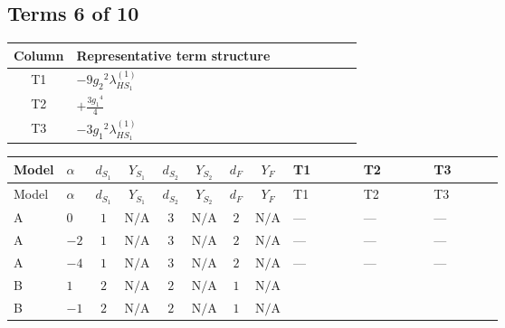 \documentclass[8pt]{article}
\begin{document}
\begin{landscape}
\subsection*{Terms 6 of 10}
\begin{center}
\begin{tabular}{@{}c >{\raggedright\arraybackslash}p{0.82\linewidth}@{}}
\toprule
Column & Representative term structure \\
\midrule
T1 & \(\displaystyle -9 {g_2}^2 {\lambda_{HS_1}^{(1)}}\) \\
\midrule
T2 & \(\displaystyle +\frac{3 {g_1}^4}{4}\) \\
\midrule
T3 & \(\displaystyle -3 {g_1}^2 {\lambda_{HS_1}^{(1)}}\) \\
\midrule
\bottomrule
\end{tabular}
\end{center}
\smallskip
\tiny
\begin{longtable}{@{}llcccccc >{\raggedright\arraybackslash}p{0.21\linewidth} >{\raggedright\arraybackslash}p{0.21\linewidth} >{\raggedright\arraybackslash}p{0.21\linewidth}@{}}
\toprule
Model & $\alpha$ & $d_{S_1}$ & $Y_{S_1}$ & $d_{S_2}$ & $Y_{S_2}$ & $d_F$ & $Y_F$ & T1 & T2 & T3 \\
\midrule
\endfirsthead
\toprule
Model & $\alpha$ & $d_{S_1}$ & $Y_{S_1}$ & $d_{S_2}$ & $Y_{S_2}$ & $d_F$ & $Y_F$ & T1 & T2 & T3 \\
\midrule
\endhead
A & $0$ & $1$ & $\text{N/A}$ & $3$ & $\text{N/A}$ & $2$ & $\text{N/A}$ & --- & --- & --- \\
\midrule
A & $-2$ & $1$ & $\text{N/A}$ & $3$ & $\text{N/A}$ & $2$ & $\text{N/A}$ & --- & --- & --- \\
\midrule
A & $-4$ & $1$ & $\text{N/A}$ & $3$ & $\text{N/A}$ & $2$ & $\text{N/A}$ & --- & --- & --- \\
\midrule
B & $1$ & $2$ & $\text{N/A}$ & $2$ & $\text{N/A}$ & $1$ & $\text{N/A}$ & \scriptsize\adjustbox{max width=\linewidth}{$\begin{gathered} -9 {g_2}^2 {\lambda_{HS_1}^{(1)}}\end{gathered}$} & \scriptsize\adjustbox{max width=\linewidth}{$\begin{gathered} +\frac{3 {g_1}^4}{4}\end{gathered}$} & \scriptsize\adjustbox{max width=\linewidth}{$\begin{gathered} -3 {g_1}^2 {\lambda_{HS_1}^{(1)}}\end{gathered}$} \\
\midrule
B & $-1$ & $2$ & $\text{N/A}$ & $2$ & $\text{N/A}$ & $1$ & $\text{N/A}$ & \scriptsize\adjustbox{max width=\linewidth}{$\begin{gathered} -9 {g_2}^2 {\lambda_{HS_1}^{(1)}}\end{gathered}$} & \scriptsize\adjustbox{max width=\linewidth}{$\begin{gathered} +\frac{3 {g_1}^4}{4}\end{gathered}$} & \scriptsize\adjustbox{max width=\linewidth}{$\begin{gathered} -3 {g_1}^2 {\lambda_{HS_1}^{(1)}}\end{gathered}$} \\

\end{longtable}
\end{landscape}
\end{document}
